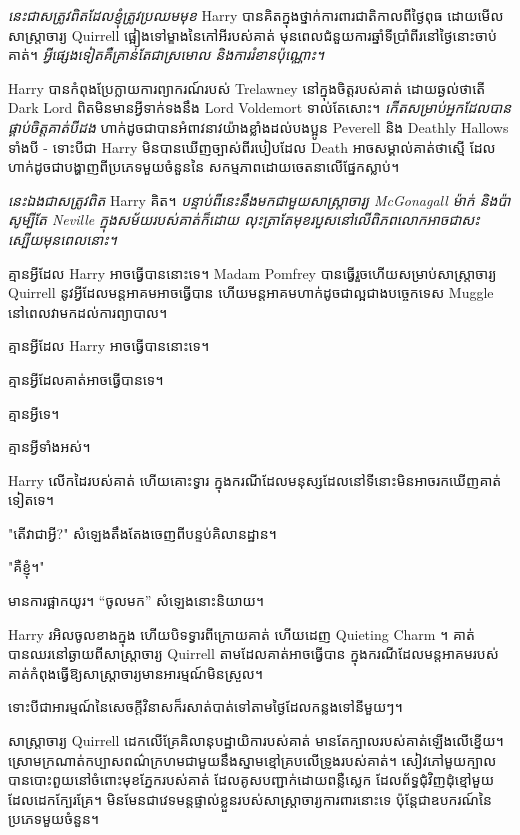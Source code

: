 \emph{នេះជាសត្រូវពិតដែលខ្ញុំត្រូវប្រឈមមុខ} Harry បានគិតក្នុងថ្នាក់ការពារជាតិកាលពីថ្ងៃពុធ ដោយមើលសាស្រ្តាចារ្យ Quirrell ផ្អៀងទៅម្ខាងនៃកៅអីរបស់គាត់ មុនពេលជំនួយការឆ្នាំទីប្រាំពីរនៅថ្ងៃនោះចាប់គាត់។ \emph{អ្វីផ្សេងទៀតគឺគ្រាន់តែជាស្រមោល និងការរំខានប៉ុណ្ណោះ។}

Harry បាន​កំពុង​ប្រែក្លាយ​ការព្យាករណ៍​របស់ Trelawney នៅក្នុង​ចិត្ត​របស់គាត់ ដោយ​ឆ្ងល់​ថា​តើ Dark Lord ពិត​មិនមាន​អ្វី​ទាក់ទង​នឹង Lord Voldemort ទាល់តែសោះ។ \emph{កើតសម្រាប់អ្នកដែលបានផ្គាប់ចិត្តគាត់បីដង} ហាក់ដូចជាបានអំពាវនាវយ៉ាងខ្លាំងដល់បងប្អូន Peverell និង Deathly Hallows ទាំងបី - ទោះបីជា Harry មិនបានឃើញច្បាស់ពីរបៀបដែល Death អាចសម្គាល់គាត់ថាស្មើ ដែលហាក់ដូចជាបង្ហាញពីប្រភេទមួយចំនួននៃ សកម្មភាពដោយចេតនាលើផ្នែកស្លាប់។

\emph{នេះឯងជាសត្រូវពិត} Harry គិត។ \emph{បន្ទាប់ពីនេះនឹងមកជាមួយសាស្រ្តាចារ្យ McGonagall ម៉ាក់ និងប៉ា សូម្បីតែ Neville ក្នុងសម័យរបស់គាត់ក៏ដោយ លុះត្រាតែមុខរបួសនៅលើពិភពលោកអាចជាសះស្បើយមុនពេលនោះ។}

គ្មានអ្វីដែល Harry អាចធ្វើបាននោះទេ។ Madam Pomfrey បានធ្វើរួចហើយសម្រាប់សាស្រ្តាចារ្យ Quirrell នូវអ្វីដែលមន្តអាគមអាចធ្វើបាន ហើយមន្តអាគមហាក់ដូចជាល្អជាងបច្ចេកទេស Muggle នៅពេលវាមកដល់ការព្យាបាល។

គ្មានអ្វីដែល Harry អាចធ្វើបាននោះទេ។

គ្មានអ្វីដែលគាត់អាចធ្វើបានទេ។

គ្មានអ្វីទេ។

គ្មានអ្វីទាំងអស់។

\later

Harry លើកដៃរបស់គាត់ ហើយគោះទ្វារ ក្នុងករណីដែលមនុស្សដែលនៅទីនោះមិនអាចរកឃើញគាត់ទៀតទេ។

"តើវាជាអ្វី?" សំឡេងតឹងតែងចេញពីបន្ទប់គិលានដ្ឋាន។

"គឺខ្ញុំ។"

មានការផ្អាកយូរ។ “ចូលមក” សំឡេងនោះនិយាយ។

Harry រអិលចូលខាងក្នុង ហើយបិទទ្វារពីក្រោយគាត់ ហើយដេញ Quieting Charm ។ គាត់បានឈរនៅឆ្ងាយពីសាស្រ្តាចារ្យ Quirrell តាមដែលគាត់អាចធ្វើបាន ក្នុងករណីដែលមន្តអាគមរបស់គាត់កំពុងធ្វើឱ្យសាស្រ្តាចារ្យមានអារម្មណ៍មិនស្រួល។

ទោះ​បី​ជា​អារម្មណ៍​នៃ​សេចក្ដី​វិនាស​ក៏​រសាត់​បាត់​ទៅ​តាម​ថ្ងៃ​ដែល​កន្លង​ទៅ​នីមួយៗ។

សាស្ត្រាចារ្យ Quirrell ដេកលើគ្រែគិលានុបដ្ឋាយិការបស់គាត់ មានតែក្បាលរបស់គាត់ឡើងលើខ្នើយ។ ស្រោម​ក្រណាត់​កប្បាស​ពណ៌​ក្រហម​ជាមួយ​នឹង​ស្នាម​ខ្មៅ​គ្រប​លើ​ទ្រូង​របស់​គាត់។ សៀវភៅមួយក្បាលបានបោះពួយនៅចំពោះមុខភ្នែករបស់គាត់ ដែលគូសបញ្ជាក់ដោយពន្លឺស្លេក ដែលព័ទ្ធជុំវិញដុំខ្មៅមួយ ដែលដេកក្បែរគ្រែ។ មិនមែនជាវេទមន្តផ្ទាល់ខ្លួនរបស់សាស្ត្រាចារ្យការពារនោះទេ ប៉ុន្តែជាឧបករណ៍នៃប្រភេទមួយចំនួន។

